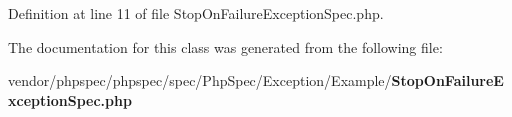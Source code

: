 Definition at line 11 of file Stop\+On\+Failure\+Exception\+Spec.\+php.



The documentation for this class was generated from the following file\+:\begin{DoxyCompactItemize}
\item 
vendor/phpspec/phpspec/spec/\+Php\+Spec/\+Exception/\+Example/{\bf Stop\+On\+Failure\+Exception\+Spec.\+php}\end{DoxyCompactItemize}
